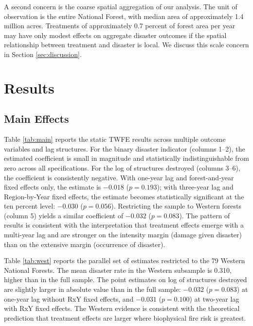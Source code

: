 \documentclass[12pt, letterpaper]{article}
\begin{document}
A second concern is the coarse spatial aggregation of our analysis. The unit of observation is the entire National Forest, with median area of approximately 1.4 million acres. Treatments of approximately 0.7 percent of forest area per year may have only modest effects on aggregate disaster outcomes if the spatial relationship between treatment and disaster is local. We discuss this scale concern in Section \ref{sec:discussion}.

\section{Results}\label{sec:results}

\subsection{Main Effects}



Table \ref{tab:main} reports the static TWFE results across multiple outcome variables and lag structures. For the binary disaster indicator (columns 1--2), the estimated coefficient is small in magnitude and statistically indistinguishable from zero across all specifications. For the log of structures destroyed (columns 3--6), the coefficient is consistently negative. With one-year lag and forest-and-year fixed effects only, the estimate is $-0.018$ ($p = 0.193$); with three-year lag and Region-by-Year fixed effects, the estimate becomes statistically significant at the ten percent level: $-0.030$ ($p = 0.056$). Restricting the sample to Western forests (column 5) yields a similar coefficient of $-0.032$ ($p = 0.083$). The pattern of results is consistent with the interpretation that treatment effects emerge with a multi-year lag and are stronger on the intensity margin (damage given disaster) than on the extensive margin (occurrence of disaster).



Table \ref{tab:west} reports the parallel set of estimates restricted to the 79 Western National Forests. The mean disaster rate in the Western subsample is 0.310, higher than in the full sample. The point estimates on log of structures destroyed are slightly larger in absolute value than in the full sample: $-0.032$ ($p = 0.083$) at one-year lag without RxY fixed effects, and $-0.031$ ($p = 0.100$) at two-year lag with RxY fixed effects. The Western evidence is consistent with the theoretical prediction that treatment effects are larger where biophysical fire risk is greatest.
\end{document}

